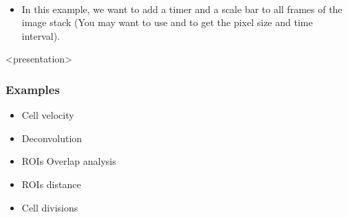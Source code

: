 \begin{frame}[fragile]
  \begin{example}~\par
    \begin{itemize}
    \item In this example, we want to add a timer and a scale bar to
      all frames of the image stack (You may want to use  and  to get the pixel size and time interval).
       \only<presentation>{}
    \end{itemize}
  \end{example}
\end{frame}

\begin{frame}<presentation>
  \frametitle{Examples}
  \begin{itemize}
  \item Cell velocity
  \item Deconvolution
  \item ROIs Overlap analysis
  \item ROIs distance
  \item Cell divisions
  \end{itemize}
\end{frame}

